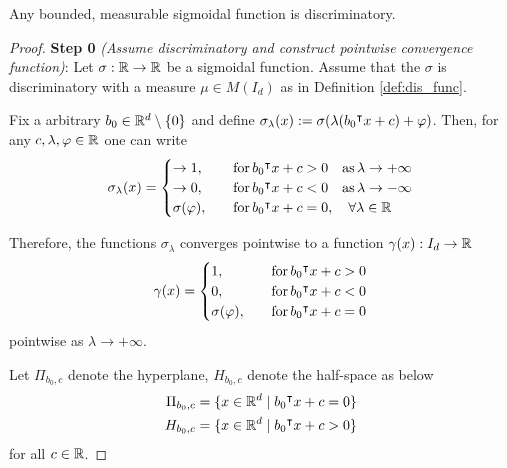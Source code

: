\begin{lemma}
    Any bounded, measurable sigmoidal function is discriminatory.
\end{lemma}

\begin{proof}

    \textbf{Step 0} \textit{(Assume discriminatory and construct pointwise
    convergence function)}: Let $\sigma: \mathbb{R} \to \mathbb{R}$ be a sigmoidal function.
    Assume that the $\sigma$ is discriminatory with a measure $\mu \in M(I_d)$
    as in Definition \ref{def:dis_func}.

    Fix a arbitrary $b_0 \in \mathbb{R}^d\setminus \{0\}$ and define
    $\sigma_{\lambda}(x) := \sigma(\lambda (b_0{}^{\intercal} x + c) + \varphi)$. Then, for
    any $c, \lambda, \varphi \in \mathbb{R}$ one can write
    \begin{equation}
        \sigma_{\lambda}(x)
        = \begin{cases}
            \to 1, \quad &\operatorname{for} b_0{}^{\intercal} x + c > 0 \quad \text{as}\, \lambda \to +\infty \\
            \to 0, \quad &\operatorname{for} b_0{}^{\intercal} x + c < 0 \quad \text{as}\, \lambda \to -\infty \\
            \sigma(\varphi), \quad &\operatorname{for} b_0{}^{\intercal} x + c = 0, \quad\forall \lambda \in \mathbb{R}
        \end{cases}
    \end{equation}

    Therefore, the functions $\sigma_{\lambda}$ converges pointwise to a
    function $\gamma(x): I_d \to \mathbb{R}$
    \begin{equation}
        \gamma(x) = 
        \begin{cases}
            1,               \quad &\operatorname{for} b_0{}^{\intercal} x + c > 0 \\
            0,               \quad &\operatorname{for} b_0{}^{\intercal} x + c < 0 \\
            \sigma(\varphi), \quad &\operatorname{for} b_0{}^{\intercal} x + c = 0
        \end{cases}
    \end{equation}
    pointwise as $\lambda \to + \infty$.
    
    Let $\Pi_{b_0,c}$ denote the hyperplane, $H_{b_0, c}$ denote the
    half-space as below 
    \begin{align}
        \Pi_{b_0,c} &= \{x\in\mathbb{R}^d \mid b_0{}^{\intercal} x + c = 0\} \\
        H_{b_0, c}  &= \{x\in\mathbb{R}^d \mid b_0{}^{\intercal} x + c > 0\}
    \end{align}
    for all $c \in \mathbb{R}$.
    

\end{proof}
